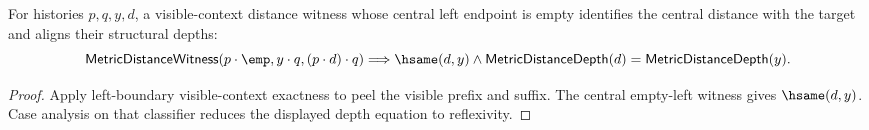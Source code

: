 \begin{theorem}
\label{thm:metric-distance-witness-left-boundary-visible-context-distance-target}
For histories $p,q,y,d$, a visible-context distance witness whose central left
endpoint is empty identifies the central distance with the target and aligns
their structural depths:
$$
\mathsf{MetricDistanceWitness}(p\cdot\emp,y\cdot q,(p\cdot d)\cdot q)
\Longrightarrow
\hsame(d,y)\land
\mathsf{MetricDistanceDepth}(d)=\mathsf{MetricDistanceDepth}(y).
$$
\end{theorem}
\begin{proof}
Apply left-boundary visible-context exactness to peel the visible prefix and
suffix. The central empty-left witness gives $\hsame(d,y)$. Case analysis on
that classifier reduces the displayed depth equation to reflexivity.
\end{proof}
